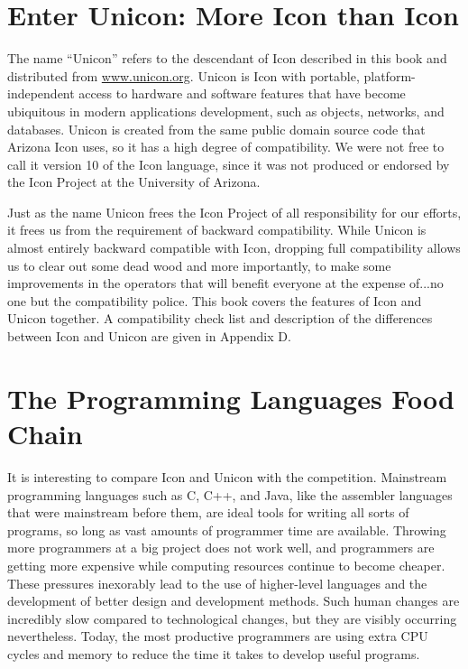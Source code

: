 \section{Enter Unicon: More Icon than Icon}

The name ``Unicon'' refers to the descendant of
Icon described in this book and
distributed from \url{www.unicon.org}.  Unicon is
Icon with portable, platform-independent access to hardware and
software features that have become ubiquitous in modern
applications development, such as objects, networks, and databases.
Unicon is created from the same public domain source code that Arizona
Icon uses, so it has a high degree of compatibility. We were not
free to call it version 10 of the Icon
language, since it was not produced or endorsed by the Icon Project at
the University of Arizona.

Just as the name Unicon frees the Icon Project of all responsibility for
our efforts, it frees us from the requirement of backward
compatibility. While Unicon is almost entirely backward compatible
with Icon, dropping full
compatibility allows us to clear out some dead wood and more
importantly, to make some improvements in the operators that will
benefit everyone at the expense of...no one but the compatibility
police.
This book covers the features of Icon and Unicon together. A
compatibility check list and description of the differences
between Icon and Unicon are given in Appendix D.

\section{The Programming Languages Food Chain}

It is interesting to compare Icon and Unicon with the competition.
Mainstream programming languages
such as C, C++, and Java, like the assembler languages that
were mainstream before them, are ideal tools
for writing all sorts of programs, so long as vast amounts of
programmer time are available. Throwing more programmers at a big
project does not work well, and programmers are getting more expensive
while computing
resources continue to become cheaper. These pressures
inexorably lead to the use of higher-level languages and the
development of better design and development methods. Such human
changes are incredibly slow compared to technological changes, but they
are visibly occurring nevertheless. Today, the most
productive programmers are using extra CPU cycles and memory
to reduce the time it takes to develop useful programs.

